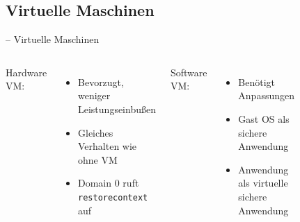 \documentclass[fleqn,11pt,aspectratio=43,table]{beamer}
\begin{document}
\subsection{Virtuelle Maschinen}

\begin{frame}{\insertsectionhead -- Virtuelle Maschinen}
	\begin{columns}
		Hardware VM: \vfill
		\begin{itemize}
			\item Bevorzugt, weniger Leistungseinbußen %
			\item Gleiches Verhalten wie ohne VM  \vfill %
			\item Domain $0$ ruft \texttt{restorecontext} auf \vfill
		\end{itemize} \vspace{1em}
		Software VM: \vfill
		\begin{itemize}
			\item Benötigt Anpassungen \vfill
			\item Gast OS als sichere Anwendung \vfill
			\item Anwendung als virtuelle sichere Anwendung \vfill
		\end{itemize}
			\vspace{-.5em}
			\begin{figure}
			\centering
			\begin{subfigure}[b]{\columnwidth}
				\includegraphics[width=.8\columnwidth]{hvm2}

\end{subfigure}
\end{figure}
\end{columns}
\end{frame}
\end{document}

